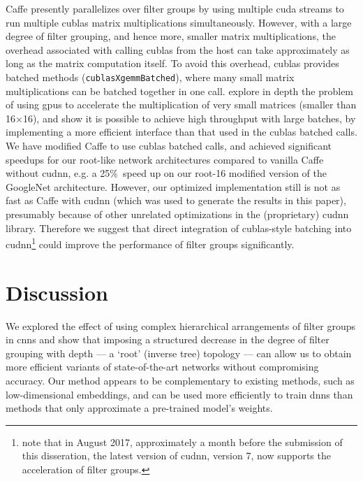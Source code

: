 \documentclass[thesis]{subfiles}
\begin{document}
	Caffe presently parallelizes over filter groups by using multiple \gls{cuda} streams to run multiple \gls{cublas} matrix multiplications simultaneously. However, with a large degree of filter grouping, and hence more, smaller matrix multiplications, the overhead associated with calling \gls{cublas} from the host can take approximately as long as the matrix computation itself. To avoid this overhead, \gls{cublas} provides batched methods (\eg \texttt{cublasXgemmBatched}), where many small matrix multiplications can be batched together in one call. \citet{Jhurani2015} explore in depth the problem of using \gls{gpu}s to accelerate the multiplication of very small matrices (smaller than 16$\times$16), and show it is possible to achieve high throughput with large batches, by implementing a more efficient interface than that used in the \gls{cublas} batched calls.
	We have modified Caffe to use \gls{cublas} batched calls, and achieved significant speedups for our  root-like network architectures compared to vanilla Caffe without \gls{cudnn}, e.g. a 25\%\ speed up on our root-16 modified version of the GoogleNet architecture. However, our optimized implementation still is not as fast as Caffe with \gls{cudnn} (which was used to generate the results in this paper), presumably because of other unrelated optimizations in the (proprietary) \gls{cudnn} library. Therefore we suggest that direct integration of \gls{cublas}-style batching into \gls{cudnn}\footnote{note that in August 2017, approximately a month before the submission of this disseration, the latest version of \gls{cudnn}, version 7, now supports the acceleration of filter groups.} could improve the performance of filter groups significantly.
	
	\section{Discussion}
	We explored the effect of using complex hierarchical arrangements of filter groups in \glspl{cnn} and show that imposing a structured decrease in the degree of filter grouping with depth --- a `root' (inverse tree) topology --- can allow us to obtain more efficient variants of state-of-the-art networks without compromising accuracy. Our method appears to be complementary to existing methods, such as low-dimensional embeddings, and can be used more efficiently to train \glspl{dnn} than methods that only approximate a pre-trained model's weights.
	
\end{document}
